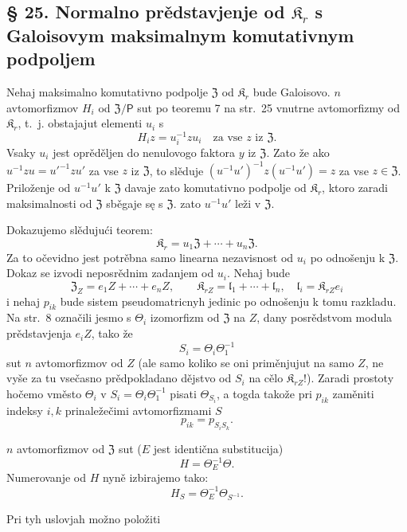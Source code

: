 \documentclass[11pt]{article}
\begin{document}
\subsection*{§ 25. Normalno prědstavjenje od \(\mathfrak K_r\) s Galoisovym maksimalnym komutativnym podpoljem\protect\footnotemark}
\label{normaldarstellung-von-r_r-mit-galoisschem-maximalem-kommutativem-teilkoerper-1}

Nehaj maksimalno komutativno podpolje \(\mathfrak Z\) od \(\mathfrak K_r\) bude Galoisovo. \(n\) avtomorfizmov \(H_i\) od \(\mathfrak Z/\mathsf P\) sut po teoremu 7 na str.~25 vnutrne avtomorfizmy od \(\mathfrak K_r\), t.~j. obstajajut elementi \(u_i\) s
\[
H_i z=u_i^{-1}zu_i\quad\text{za vse }z\text{ iz }\mathfrak Z.
\]
Vsaky \(u_i\) jest oprěděljen do nenulovogo faktora \(y\) iz \(\mathfrak Z\). Zato že ako \(u^{-1}zu=u'^{-1}zu'\) za vse \(z\) iz \(\mathfrak Z\), to slěduje \((u^{-1}u')^{-1}z(u^{-1}u')=z\) za vse \(z\in\mathfrak Z\). Priloženje od \(u^{-1}u'\) k \(\mathfrak Z\) davaje zato komutativno podpolje od \(\mathfrak K_r\), ktoro zaradi maksimalnosti od \(\mathfrak Z\) sběgaje sę s \(\mathfrak Z\). zato \(u^{-1}u'\) leži v \(\mathfrak Z\).

Dokazujemo slědujući teorem:
\[
\mathfrak K_r=u_1\mathfrak Z+\cdots+u_n\mathfrak Z.
\]
Za to očevidno jest potrěbna samo linearna nezavisnost od \(u_i\) po odnošenju k \(\mathfrak Z\). Dokaz se izvodi neposrědnim zadanjem od \(u_i\). Nehaj bude
\[
\mathfrak Z_Z=e_1Z+\cdots+e_nZ,\qquad
\mathfrak K_{rZ}=\mathfrak l_1+\cdots+\mathfrak l_n,\quad
\mathfrak l_i=\mathfrak K_{rZ}e_i
\]
i nehaj \(p_{ik}\) bude sistem pseudomatricnyh jedinic po odnošenju k tomu razkladu. Na str.~8 označili jesmo s \(\Theta_i\) izomorfizm od \(\mathfrak Z\) na \(Z\), dany posrědstvom modula prědstavjenja \(e_iZ\), tako že
\[
S_i=\Theta_i\Theta_1^{-1}
\]
sut \(n\) avtomorfizmov od \(Z\) (ale samo koliko se oni priměnjujut na samo \(Z\), ne vyše za tu vsečasno prědpokladano dějstvo od \(S_i\) na cělo \(\mathfrak K_{rZ}\)!). Zaradi prostoty hočemo vměsto \(\Theta_i\) v \(S_i=\Theta_i\Theta_1^{-1}\) pisati \(\Theta_{S_i}\), a togda takože pri \(p_{ik}\) zaměniti indeksy \(i,k\) prinaležečimi avtomorfizmami \(S\)
\[
p_{ik}=p_{S_iS_k}.
\]

\(n\) avtomorfizmov od \(\mathfrak Z\) sut (\(E\) jest identična substitucija)
\[
H=\Theta_E^{-1}\Theta.
\]
Numerovanje od \(H\) nyně izbirajemo tako:
\[
H_S=\Theta_E^{-1}\Theta_{S^{-1}}.
\]

Pri tyh uslovjah možno položiti
\end{document}
